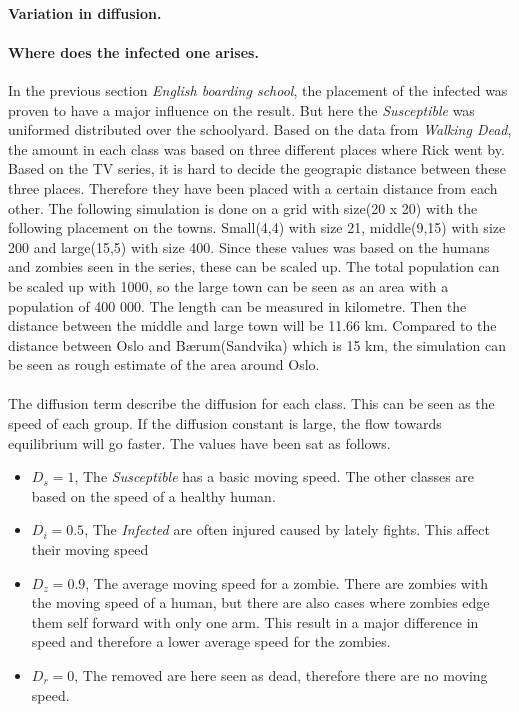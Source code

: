 \documentclass[%
twoside,                 %
final,                   %
10pt]{article}
\begin{document}



\paragraph{Variation in diffusion.}

\paragraph{Where does the infected one arises.}
In the previous section \emph{English boarding school}, the placement of the infected was proven to have a major influence on the result. But here the \emph{Susceptible} was uniformed distributed over the schoolyard. Based on the data from \emph{Walking Dead}, the amount in each class was based on three different places where Rick went by. Based on the TV series, it is hard to decide the geograpic distance between these three places. Therefore they have been placed with a certain distance from each other. The following simulation is done on a grid with size(20 x 20) with the following placement on the towns. Small(4,4) with size 21, middle(9,15) with size 200 and large(15,5) with size 400. Since these values was based on the humans and zombies seen in the series, these can be scaled up. The total population can be scaled up with 1000, so the large town can be seen as an area with a population of 400 000. The length can be measured in kilometre. Then the distance between the middle and large town will be 11.66 km. Compared to the distance between Oslo and Bærum(Sandvika) which is 15 km, the simulation can be seen as rough estimate of the area around Oslo.
\\
\\
The diffusion term describe the diffusion for each class. This can be seen as the speed of each group. If the diffusion constant is large, the flow towards equilibrium will go faster. The values have been sat as follows. 
\begin{itemize}
\item $D_s=1$, The \emph{Susceptible} has a basic moving speed. The other classes are based on the speed of a healthy human.

\item $D_i=0.5$, The \emph{Infected} are often injured caused by lately fights. This affect their moving speed

\item $D_z=0.9$, The average moving speed for a zombie. There are zombies with the moving speed of a human, but there are also cases where zombies edge them self forward with only one arm. This result in a major difference in speed and therefore a lower average speed for the zombies.

\item $D_r=0$, The removed are here seen as dead, therefore there are no moving speed.
\end{itemize}
\end{document}
